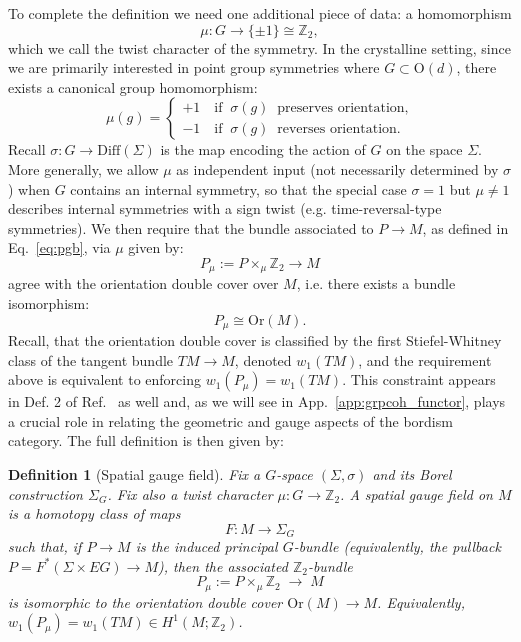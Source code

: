 \documentclass[aps,prx,reprint,superscriptaddress,twocolumn,amsmath,amssymb,amsfonts, nofootinbib]{revtex4-2}
\newcommand{\Z}{\mathbb{Z}}
\theoremstyle{apsstyle}
\newtheorem{definition}[theorem]{Definition}
\begin{document}
To complete the definition we need one additional piece of data: a homomorphism
\begin{equation*}
\mu: G\to \{\pm 1\}\cong \mathbb Z_2,
\end{equation*}
which we call the twist character of the symmetry. In the crystalline setting, since we are primarily interested in point group symmetries where $G\subset \mathrm{O}(d)$, there exists a canonical group homomorphism:
\begin{equation*}
\mu(g)=
\begin{cases}
+1\quad \text{if}\;\; \sigma(g)\;\; \text{preserves orientation,}\\
-1\quad \text{if}\;\; \sigma(g)\;\; \text{reverses orientation.}
\end{cases}
\end{equation*}
Recall $\sigma: G \to \mathrm{Diff}(\Sigma)$ is the map encoding the action of $G$ on the space $\Sigma$. More generally, we allow $\mu$ as independent input (not necessarily determined by $\sigma$) when $G$ contains an internal symmetry, so that the special case $\sigma=1$ but $\mu\neq 1$ describes internal symmetries with a sign twist (e.g. time-reversal-type symmetries). We then require that the bundle associated to $P\to M$, as defined in Eq.~\ref{eq:pgb}, via $\mu$ given by:
\begin{equation*}
    P_{\mu}:= P\times_{\mu}\Z_{2} \longrightarrow M
\end{equation*}
agree with the orientation double cover over $M$, i.e. there exists a bundle isomorphism:
\begin{equation*}
    P_{\mu}\cong \mathrm{Or}(M).
\end{equation*}
Recall, that the orientation double cover is classified by the first Stiefel-Whitney class of the tangent bundle $TM \to M$, denoted $w_{1}(TM)$, and the requirement above is equivalent to enforcing $w_{1}(P_{\mu})=w_{1}(TM)$. This constraint appears in Def. 2 of Ref.~\cite{ThorngrenElse} as well and, as we will see in App.~\ref{app:grpcoh_functor}, plays a crucial role in relating the geometric and gauge aspects of the bordism category. The full definition is then given by:

\bigskip 

\begin{definition}[Spatial gauge field]
\label{def:sgf_full}
Fix a $G$-space $(\Sigma,\sigma)$ and its Borel construction $\Sigma_G$. Fix also a twist character $\mu:G\to \mathbb Z_2$. A spatial gauge field on $M$ is a homotopy class of maps 
\begin{equation*}
F:M\longrightarrow  \Sigma_G
\end{equation*}
such that, if $P\to M$ is the induced principal $G$-bundle (equivalently, the pullback $P=F^{*}(\Sigma\times EG)\to M$), then the associated $\mathbb Z_2$-bundle
\begin{equation*}
    P_{\mu}:=P\times_{\mu}\mathbb Z_2 \;\longrightarrow\; M
\end{equation*}
is isomorphic to the orientation double cover $\mathrm{Or}(M)\to M$. Equivalently, $w_1(P_{\mu})=w_1(TM)\in H^1(M;\mathbb Z_2)$.
\end{definition}
\end{document}
